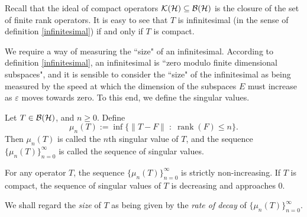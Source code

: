 \begin{remark}
    Recall that the ideal of compact operators $\mathcal{K}(\mathcal{H}) \subseteq \mathcal{B}(\mathcal{H})$
    is the closure of the set of finite rank operators. It is easy to see that $T$
    is infinitesimal (in the sense of definition \ref{infinitesimal}) if and only
    if $T$ is compact.
\end{remark}

We require a way of measuring the ``size" of an infinitesimal. According to
definition \ref{infinitesimal}, an infinitesimal is ``zero modulo finite dimensional
subspaces", and it is sensible to consider the ``size" of the infinitesimal
as being measured by the speed at which the dimension of the subspaces $E$
must increase as $\varepsilon$ moves towards zero. To this end, we define
the singular values.
\begin{definition}
    Let $T \in \mathcal{B}(\mathcal{H})$, and $n \geq 0$. Define
    \begin{equation}
        \mu_n(T) := \inf\{\|T-F\|\;:\;\operatorname{rank}(F) \leq n\}.
    \end{equation}
    Then $\mu_n(T)$ is called the $n$th singular value of $T$, and the sequence
    $\{\mu_n(T)\}_{n=0}^\infty$ is called the sequence of singular values. 
\end{definition}

\begin{remark}
    For any operator $T$, the sequence $\{\mu_n(T)\}_{n=0}^\infty$
    is strictly non-increasing.
    If $T$ is compact, the sequence of singular values of $T$
    is decreasing and approaches $0$.
\end{remark}

We shall regard the \emph{size} of $T$ as being given by the \emph{rate of decay}
of $\{\mu_n(T)\}_{n=0}^\infty$. 



